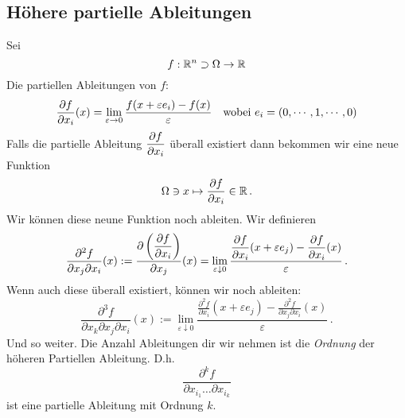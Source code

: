 \subsection{Höhere partielle Ableitungen}
Sei
\[f:\mathbb{R}^n \supset \Omega\rightarrow\mathbb{R}\]
Die partiellen Ableitungen von $f$:
\[\dfrac{\partial f}{\partial x_i}(x)=\displaystyle\lim_{\varepsilon\rightarrow0}\frac{f(x+\varepsilon e_i)-f(x)}{\varepsilon}
\quad \mbox{wobei } e_i=(0,\cdots,1,\cdots,0)\]
Falls die partielle Ableitung $\dfrac{\partial f}{\partial x_i}$ \"uberall existiert dann bekommen wir eine
neue Funktion
\[\Omega \ni x \mapsto \dfrac{\partial f}{\partial x_i}\in\mathbb{R}\, .
\]
Wir k\"onnen diese neune Funktion noch ableiten. Wir definieren
\[\frac{\partial^2f}{\partial x_j\partial x_i}  (x)
:= \dfrac{\partial \left( \dfrac{\partial f}{\partial x_i} \right)}{\partial x_j}(x)
=\lim_{\varepsilon\downarrow 0}\frac{\dfrac{\partial f}{\partial x_i}(x+\varepsilon e_j)-\dfrac{\partial f}{\partial x_i}(x)}{\varepsilon}\, .\]
Wenn auch diese \"uberall existiert, k\"onnen wir noch ableiten:
\[\frac{\partial^3f}{\partial x_k\partial x_j \partial x_i}(x)
:=\lim_{\varepsilon\downarrow 0}\frac{\frac{\partial^2f}{\partial x_i}(x+\varepsilon e_j)-\frac{\partial ^2f}{\partial x_j \partial x_i}(x)}{\varepsilon}\, .\]
Und so weiter. Die Anzahl Ableitungen dir wir nehmen ist die {\em Ordnung} der
h\"oheren Partiellen Ableitung. D.h.
\[
\frac{\partial^k f}{\partial x_{i_1} \ldots \partial x_{i_k}}
\]
ist eine partielle Ableitung mit Ordnung $k$.

